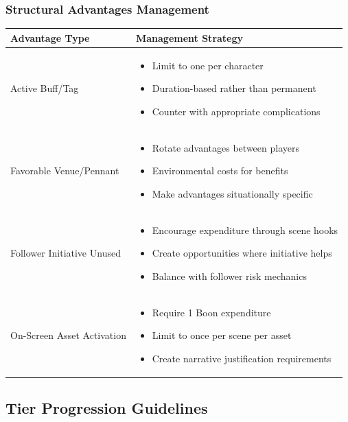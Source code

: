 \documentclass[11pt,letterpaper]{article}
\begin{document}
\subsubsection{Structural Advantages Management}

\begin{longtable}{|>{\raggedright\arraybackslash}p{4cm}|>{\raggedright\arraybackslash}p{8cm}|}
\hline
\textbf{Advantage Type} & \textbf{Management Strategy} \\
\hline
Active Buff/Tag & 
\begin{itemize}
    \item Limit to one per character
    \item Duration-based rather than permanent
    \item Counter with appropriate complications
\end{itemize} \\
\hline
Favorable Venue/Pennant & 
\begin{itemize}
    \item Rotate advantages between players
    \item Environmental costs for benefits
    \item Make advantages situationally specific
\end{itemize} \\
\hline
Follower Initiative Unused & 
\begin{itemize}
    \item Encourage expenditure through scene hooks
    \item Create opportunities where initiative helps
    \item Balance with follower risk mechanics
\end{itemize} \\
\hline
On-Screen Asset Activation & 
\begin{itemize}
    \item Require 1 Boon expenditure
    \item Limit to once per scene per asset
    \item Create narrative justification requirements
\end{itemize} \\
\hline
\end{longtable}

\subsection{Tier Progression Guidelines}
\end{document}
